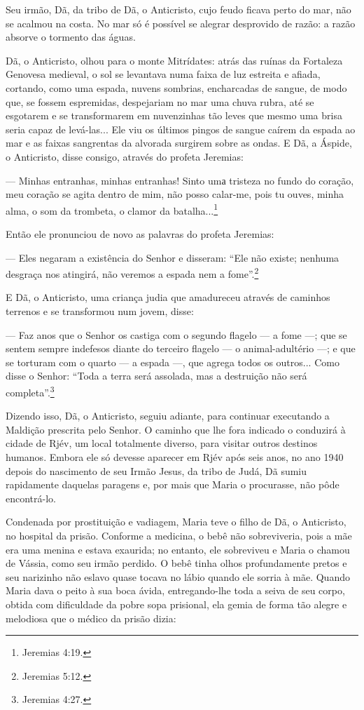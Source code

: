 Seu irmão, Dã, da tribo de Dã, o Anticristo, cujo feudo ficava perto do
mar, não se acalmou na costa. No mar só é possível se alegrar desprovido
de razão: a razão absorve o tormento das águas.

Dã, o Anticristo, olhou para o monte Mitrídates: atrás das ruínas da
Fortaleza Genovesa medieval, o sol se levantava numa faixa de luz
estreita e afiada, cortando, como uma espada, nuvens sombrias,
encharcadas de sangue, de modo que, se fossem espremidas, despejariam no
mar uma chuva rubra, até se esgotarem e se transformarem em nuvenzinhas
tão leves que mesmo uma brisa seria capaz de levá-las... Ele viu os
últimos pingos de sangue caírem da espada ao mar e as faixas sangrentas
da alvorada surgirem sobre as ondas. E Dã, a Áspide, o Anticristo, disse
consigo, através do profeta Jeremias:

--- Minhas entranhas, minhas entranhas! Sinto umа tristeza no fundo do
coração, meu coração se agita dentro de mim, não posso calar-me, pois tu
ouves, minha alma, o som da trombeta, o clamor da batalha...\footnote{Jeremias
  4:19.}

Então ele pronunciou de novo as palavras do profeta Jeremias:

--- Eles negaram a existência do Senhor e disseram: ``Ele não existe;
nenhuma desgraça nos atingirá, não veremos a espada nem a
fome''.\footnote{Jeremias 5:12.}

E Dã, o Anticristo, uma criança judia que amadureceu através de caminhos
terrenos e se transformou num jovem, disse:

--- Faz anos que o Senhor os castiga com o segundo flagelo --- a fome
---; que se sentem sempre indefesos diante do terceiro flagelo --- o
animal-adultério ---; e que se torturam com o quarto --- a espada ---,
que agrega todos os outros... Como disse o Senhor: ``Toda a terra será
assolada, mas a destruição não será completa''.\footnote{Jeremias 4:27.}

Dizendo isso, Dã, o Anticristo, seguiu adiante, para continuar
executando a Maldição prescrita pelo Senhor. O caminho que lhe fora
indicado o conduzirá à cidade de Rjév, um local totalmente diverso, para
visitar outros destinos humanos. Embora ele só devesse aparecer em Rjév
após seis anos, no ano 1940 depois do nascimento de seu Irmão Jesus, da
tribo de Judá, Dã sumiu rapidamente daquelas paragens e, por mais que
Maria o procurasse, não pôde encontrá-lo.

Condenada por prostituição e vadiagem, Maria teve o filho de Dã, o
Anticristo, no hospital da prisão. Conforme a medicina, o bebê não
sobreviveria, pois a mãe era uma menina e estava exaurida; no entanto,
ele sobreviveu e Maria o chamou de Vássia, como seu irmão perdido. O
bebê tinha olhos profundamente pretos e seu narizinho não eslavo quase
tocava no lábio quando ele sorria à mãe. Quando Maria dava o peito à sua
boca ávida, entregando-lhe toda a seiva de seu corpo, obtida com
dificuldade da pobre sopa prisional, ela gemia de forma tão alegre e
melodiosa que o médico da prisão dizia:

